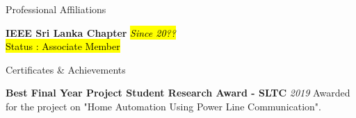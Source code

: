 \documentclass[
	11pt, %
]{./assets/resume} %
\begin{document}









\begin{rSection}{Professional Affiliations}

	\textbf{IEEE Sri Lanka Chapter} \hfill \hl{\textit{Since 20??}} \\ 
	\hl{Status : Associate Member}

\end{rSection}


\begin{rSection}{Certificates \& Achievements}

	\textbf{Best Final Year Project Student Research Award - SLTC} \hfill \textit{2019}
    Awarded for the project on "Home Automation Using Power Line Communication".

\end{rSection}
\end{document}
